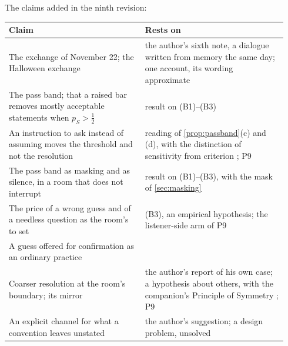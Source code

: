 \noindent The claims added in the ninth revision:
\begin{center}\small
\begin{tabular}{p{0.46\linewidth} p{0.48\linewidth}}
\toprule
Claim & Rests on \\
\midrule
The exchange of November 22; the Halloween exchange & the author's sixth note, a dialogue written from memory the same day; one account, its wording approximate \\
The pass band; that a raised bar removes mostly acceptable statements when $p_S > \tfrac12$ & result on (B1)--(B3) \\
An instruction to ask instead of assuming moves the threshold and not the resolution & reading of \autoref{prop:passband}(c) and (d), with the distinction of sensitivity from criterion \cite{GreenSwets1966}; P9 \\
The pass band as masking and as silence, in a room that does not interrupt & result on (B1)--(B3), with the mask of \autoref{sec:masking} \\
The price of a wrong guess and of a needless question as the room's to set & (B3), an empirical hypothesis; the listener-side arm of P9 \\
A guess offered for confirmation as an ordinary practice & \cite{Pomerantz1988} \\
Coarser resolution at the room's boundary; its mirror & the author's report of his own case; a hypothesis about others, with the companion's Principle of Symmetry \cite{NormCost}; P9 \\
An explicit channel for what a convention leaves unstated & the author's suggestion; a design problem, unsolved \\
\bottomrule
\end{tabular}
\end{center}

